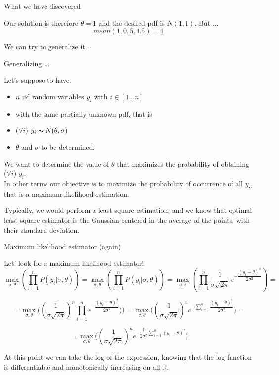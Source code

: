 \documentclass{beamer}
\begin{document}
\begin{frame}
{\centerline{What we have discovered }}
Our solution is therefore $\theta = 1$ and the desired pdf is $N(1,1)$. But ... 
$$mean(1, 0,5, 1.5) = 1$$

\vspace*{3.5cm}
We can try to generalize it...

\end{frame}

\begin{frame}
{\centerline{Generalizing ... }}

Let's suppose to have:
\begin{itemize}
\item $n$ iid random variables $y_i$ with $ i \in [1 \ldots n]$
\item with the same partially unknown pdf, that is
\item ($\forall i$) $y_i \thicksim N(\theta,\sigma)$
\item $\theta$ and $\sigma$ to be determined.
\end{itemize}

We want to determine the value of $\theta$ that maximizes the probability of obtaining ($\forall i$) $y_i$.\\

\vspace*{0.5cm}
In other terms our objective is to maximize the probability of occurrence of all $y_i$, that is a maximum likelihood estimation.

\vspace*{0.5cm}
Typically, we would perform a least square estimation, and we know that optimal least square estimator is the Gaussian centered in the average of the points, with their standard deviation.
\end{frame}




\begin{frame}
{\centerline{Maximum likelihood estimator (again) }}
Let' look for a maximum likelihood estimator!
$$ \max_{\sigma, \theta}(\prod_{i=1}^n P(y_i | \sigma, \theta)) = \max_{\sigma, \theta}(\prod_{i=1}^n P(y_i | \sigma, \theta)) =  \max_{\sigma, \theta}(\prod_{i=1}^n \dfrac 1 {\sigma \sqrt{2 \pi} } \, e^{-\dfrac { ({y_i - \theta})^2} {2 \sigma^2} })=$$

$$ = \max_{\sigma, \theta} \big((\dfrac 1 {\sigma \sqrt{2 \pi} } )^{n} \prod_{i=1}^n  e^{-\dfrac { ({y_i - \theta})^2} {2 \sigma^2} }\big))=
\max_{\sigma, \theta} \big((\dfrac 1 {\sigma \sqrt{2 \pi} } )^{n} e^{- \sum_{i=1}^n  \dfrac { ({y_i - \theta})^2} {2 \sigma^2} }) = $$

$$  =
\max_{\sigma, \theta} \big((\dfrac 1 {\sigma \sqrt{2 \pi} } )^{n} e^{-   \dfrac { 1 } {2 \sigma^2} \sum_{i=1}^n  ({y_i - \theta})^2} ) $$

At this point we can take the log of the expression, knowing that the log function is differentiable and monotonically increasing on all $\mathbb{R}$.

\end{frame}
\end{document}
